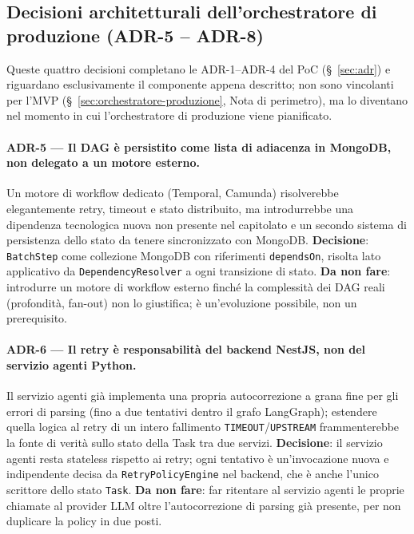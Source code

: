\documentclass[11pt,a4paper]{article}
\begin{document}
\subsection{Decisioni architetturali dell'orchestratore di produzione (ADR-5 -- ADR-8)}
\label{sub:orch-adr}

Queste quattro decisioni completano le ADR-1--ADR-4 del PoC (\S~\ref{sec:adr}) e riguardano esclusivamente il componente appena descritto; non sono vincolanti per l'MVP (\S~\ref{sec:orchestratore-produzione}, Nota di perimetro), ma lo diventano nel momento in cui l'orchestratore di produzione viene pianificato.

\paragraph{ADR-5 --- Il DAG è persistito come lista di adiacenza in MongoDB, non delegato a un motore esterno.} Un motore di workflow dedicato (Temporal, Camunda) risolverebbe elegantemente retry, timeout e stato distribuito, ma introdurrebbe una dipendenza tecnologica nuova non presente nel capitolato e un secondo sistema di persistenza dello stato da tenere sincronizzato con MongoDB. \textbf{Decisione}: \texttt{BatchStep} come collezione MongoDB con riferimenti \texttt{dependsOn}, risolta lato applicativo da \texttt{DependencyResolver} a ogni transizione di stato. \textbf{Da non fare}: introdurre un motore di workflow esterno finché la complessità dei DAG reali (profondità, fan-out) non lo giustifica; è un'evoluzione possibile, non un prerequisito.

\paragraph{ADR-6 --- Il retry è responsabilità del backend NestJS, non del servizio agenti Python.} Il servizio agenti già implementa una propria autocorrezione a grana fine per gli errori di parsing (fino a due tentativi dentro il grafo LangGraph); estendere quella logica al retry di un intero fallimento \texttt{TIMEOUT}/\texttt{UPSTREAM} frammenterebbe la fonte di verità sullo stato della Task tra due servizi. \textbf{Decisione}: il servizio agenti resta stateless rispetto ai retry; ogni tentativo è un'invocazione nuova e indipendente decisa da \texttt{RetryPolicyEngine} nel backend, che è anche l'unico scrittore dello stato \texttt{Task}. \textbf{Da non fare}: far ritentare al servizio agenti le proprie chiamate al provider LLM oltre l'autocorrezione di parsing già presente, per non duplicare la policy in due posti.
\end{document}
